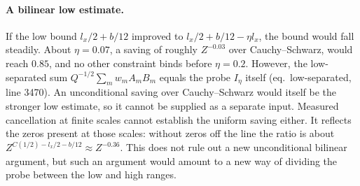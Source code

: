 \documentclass[11pt]{article}
\theoremstyle{remark}\newtheorem*{remark}{Remark}
\begin{document}
\paragraph{A bilinear low estimate.} If the low bound $l_x/2+b/12$ improved to $l_x/2+b/12-\eta l_x$, the
bound would fall steadily. About $\eta=0.07$, a saving of roughly $Z^{-0.03}$ over Cauchy--Schwarz,
would reach $0.85$, and no other constraint binds before $\eta=0.2$. However, the low-separated sum
$Q^{-1/2}\sum_m w_mA_mB_m$ equals the probe $I_\eta$ itself (eq.~low-separated, line 3470). An
unconditional saving over Cauchy--Schwarz would itself be the stronger low estimate, so it cannot
be supplied as a separate input. Measured cancellation at finite scales cannot establish the
uniform saving either. It reflects the zeros present at those scales: without zeros off the line
the ratio is about $Z^{C(1/2)-l_x/2-b/12}\approx Z^{-0.36}$. This does not rule out a new
unconditional bilinear argument, but such an argument would amount to a new way of dividing the
probe between the low and high ranges.
\end{document}
